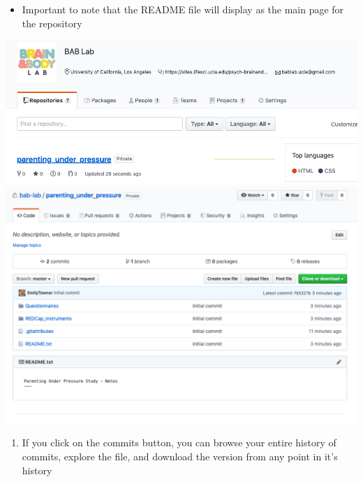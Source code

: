 \documentclass[]{book}
\providecommand{\tightlist}{%
  \setlength{\itemsep}{0pt}\setlength{\parskip}{0pt}}
\begin{document}
\begin{itemize}
\tightlist
\item
  Important to note that the README file will display as the main page
  for the repository
\end{itemize}

\includegraphics{images/research_protocols/github/13.png}
\includegraphics{images/research_protocols/github/14.png}

\begin{enumerate}
\def\labelenumi{\arabic{enumi}.}
\setcounter{enumi}{9}
\tightlist
\item
  If you click on the commits button, you can browse your entire history
  of commits, explore the file, and download the version from any point
  in it's history
\end{enumerate}
\end{document}
